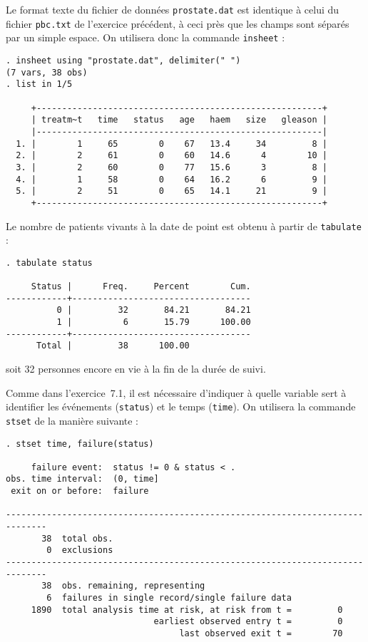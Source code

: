 \soln{\ref{exo:11.1}}
Le format texte du fichier de données \texttt{prostate.dat} est identique à
celui du fichier \texttt{pbc.txt} de l'exercice précédent, à ceci près que
les champs sont séparés par un simple espace. On utilisera donc la commande
\texttt{insheet} :
\begin{verbatim}
. insheet using "prostate.dat", delimiter(" ")
(7 vars, 38 obs)
. list in 1/5

     +--------------------------------------------------------+
     | treatm~t   time   status   age   haem   size   gleason |
     |--------------------------------------------------------|
  1. |        1     65        0    67   13.4     34         8 |
  2. |        2     61        0    60   14.6      4        10 |
  3. |        2     60        0    77   15.6      3         8 |
  4. |        1     58        0    64   16.2      6         9 |
  5. |        2     51        0    65   14.1     21         9 |
     +--------------------------------------------------------+
\end{verbatim}
Le nombre de patients vivants à la date de point est obtenu à partir de
\texttt{tabulate} :
\begin{verbatim}
. tabulate status

     Status |      Freq.     Percent        Cum.
------------+-----------------------------------
          0 |         32       84.21       84.21
          1 |          6       15.79      100.00
------------+-----------------------------------
      Total |         38      100.00
\end{verbatim}
soit 32 personnes encore en vie à la fin de la durée de suivi.

Comme dans l'exercice~7.1, il est nécessaire d'indiquer à \Stata quelle
variable sert à identifier les événements (\texttt{status}) et le temps
(\texttt{time}). On utilisera la commande \texttt{stset} de la manière
suivante :
\begin{verbatim}
. stset time, failure(status)

     failure event:  status != 0 & status < .
obs. time interval:  (0, time]
 exit on or before:  failure

------------------------------------------------------------------------------
       38  total obs.
        0  exclusions
------------------------------------------------------------------------------
       38  obs. remaining, representing
        6  failures in single record/single failure data
     1890  total analysis time at risk, at risk from t =         0
                             earliest observed entry t =         0
                                  last observed exit t =        70
\end{verbatim}

